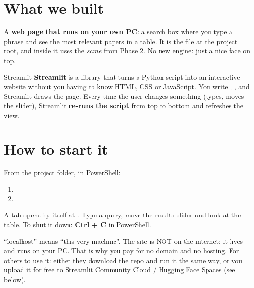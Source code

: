 \documentclass[11pt,a4paper]{article}
\begin{document}

\section{What we built}

A \textbf{web page that runs on your own PC}: a search box where you type a phrase and see the
most relevant papers in a table. It is the  file at the project root, and
inside it uses the \emph{same}  from Phase 2. No new engine: just a
nice face on top.

\begin{concepto}{Streamlit}
\textbf{Streamlit} is a library that turns a Python script into an interactive website without
you having to know HTML, CSS or JavaScript. You write ,
,  and Streamlit draws the page. Every
time the user changes something (types, moves the slider), Streamlit \textbf{re-runs the
script} from top to bottom and refreshes the view.
\end{concepto}

\section{How to start it}

\begin{practica}
From the project folder, in PowerShell:
\begin{enumerate}
  \item {}
  \item {}
\end{enumerate}
A tab opens by itself at . Type a query, move the results slider
and look at the table. To shut it down: \textbf{Ctrl + C} in PowerShell.
\end{practica}

\begin{ojo}
``localhost'' means ``this very machine''. The site is NOT on the internet: it lives and runs
on your PC. That is why you pay for no domain and no hosting. For others to use it: either
they download the repo and run it the same way, or you upload it for free to Streamlit
Community Cloud / Hugging Face Spaces (see below).
\end{ojo}
\end{document}
